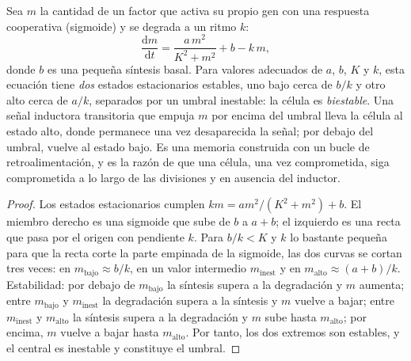 \begin{theorem}\label{thm:b2:cell-differentiation:switch}
Sea $m$ la cantidad de un factor que activa su propio gen con una
respuesta cooperativa (sigmoide) y se degrada a un ritmo $k$:
\[
\frac{\mathrm{d}m}{\mathrm{d}t} = \frac{a\,m^{2}}{K^{2} + m^{2}} + b - k\,m,
\]
donde $b$ es una pequeña síntesis basal. Para valores adecuados de $a$,
$b$, $K$ y $k$, esta ecuación tiene \emph{dos} estados estacionarios
estables, uno bajo cerca de $b/k$ y otro alto cerca de $a/k$, separados
por un umbral inestable: la célula es \emph{biestable}. Una señal inductora
transitoria que empuja $m$ por encima del umbral lleva la célula al estado
alto, donde permanece una vez desaparecida la señal; por debajo del umbral,
vuelve al estado bajo. Es una memoria construida con un bucle de
retroalimentación, y es la razón de que una célula, una vez comprometida,
siga comprometida a lo largo de las divisiones y en ausencia del inductor.
\end{theorem}
\begin{proof}
Los estados estacionarios cumplen $k m = a m^{2}/(K^{2} + m^{2}) + b$. El
miembro derecho es una sigmoide que sube de $b$ a $a + b$; el izquierdo es
una recta que pasa por el origen con pendiente $k$. Para $b/k < K$ y $k$
lo bastante pequeña para que la recta corte la parte empinada de la
sigmoide, las dos curvas se cortan tres veces: en $m_{\text{bajo}} \approx b/k$, en un
valor intermedio $m_{\text{inest}}$ y en $m_{\text{alto}} \approx (a +
b)/k$. Estabilidad: por debajo de $m_{\text{bajo}}$ la síntesis supera a la
degradación y
$m$ aumenta; entre $m_{\text{bajo}}$ y $m_{\text{inest}}$ la degradación supera
a la síntesis y $m$ vuelve a bajar; entre $m_{\text{inest}}$ y
$m_{\text{alto}}$ la síntesis supera a la degradación y $m$ sube hasta
$m_{\text{alto}}$; por encima, $m$ vuelve a bajar hasta $m_{\text{alto}}$.
Por tanto, los dos extremos son estables, y el central es inestable y
constituye el umbral.
\end{proof}

